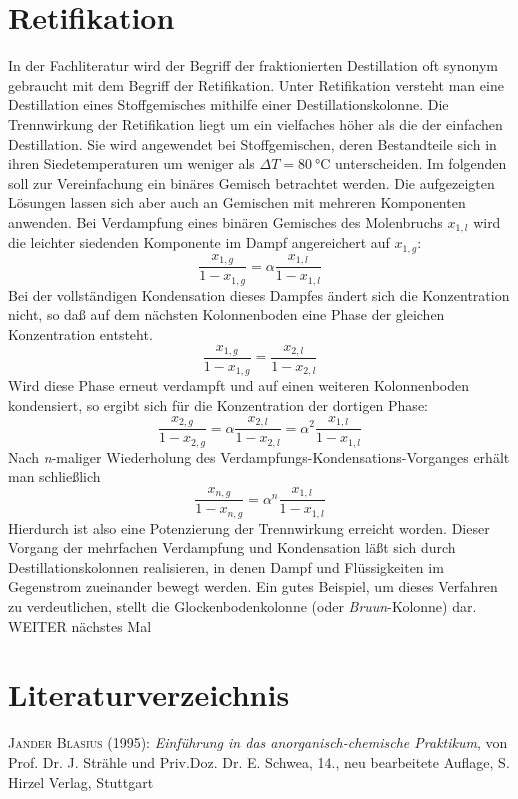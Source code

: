 \documentclass[11pt]{scrartcl}		%
\begin{document}
\section{Retifikation}
In der Fachliteratur wird der Begriff der fraktionierten Destillation oft synonym gebraucht mit dem Begriff der Retifikation. Unter Retifikation versteht man eine Destillation eines Stoffgemisches mithilfe einer Destillationskolonne. Die Trennwirkung der Retifikation liegt um ein vielfaches höher als die der einfachen Destillation. Sie wird angewendet bei Stoffgemischen, deren Bestandteile sich in ihren Siedetemperaturen um weniger als $\Delta T = \SI{80}{\celsius}$ unterscheiden.
%
Im folgenden soll zur Vereinfachung ein binäres Gemisch betrachtet werden. Die aufgezeigten Lösungen lassen sich aber auch an Gemischen mit mehreren Komponenten anwenden. Bei Verdampfung eines binären Gemisches des Molenbruchs $x_{1,l}$ wird die leichter siedenden Komponente im Dampf angereichert auf $x_{1,g}$:
\begin{equation}
	\frac{x_{1,g}}{1-x_{1,g}} = \alpha \frac{x_{1,l}}{1-x_{1,l}}
\end{equation}
Bei der vollständigen Kondensation dieses Dampfes ändert sich die Konzentration nicht, so daß auf dem nächsten Kolonnenboden eine Phase der gleichen Konzentration entsteht.
\begin{equation}
	\frac{x_{1,g}}{1-x_{1,g}} = \frac{x_{2,l}}{1-x_{2,l}}
\end{equation}
Wird diese Phase erneut verdampft und auf einen weiteren Kolonnenboden kondensiert, so ergibt sich für die Konzentration der dortigen Phase:
\begin{equation}
	\frac{x_{2,g}}{1-x_{2,g}} = \alpha \frac{x_{2,l}}{1-x_{2,l}} =  \alpha^2 \frac{x_{1,l}}{1-x_{1,l}}
\end{equation}
Nach \emph{n}-maliger Wiederholung des Verdampfungs-Kondensations-Vorganges erhält man schließlich
\begin{equation}
	\frac{x_{n,g}}{1-x_{n,g}} = \alpha^n \frac{x_{1,l}}{1-x_{1,l}}
\end{equation}
Hierdurch ist also eine Potenzierung der Trennwirkung erreicht worden.
Dieser Vorgang der mehrfachen Verdampfung und Kondensation läßt sich durch Destillationskolonnen realisieren, in denen Dampf und Flüssigkeiten im Gegenstrom zueinander bewegt werden. Ein gutes Beispiel, um dieses Verfahren zu verdeutlichen, stellt die Glockenbodenkolonne (oder \emph{Bruun}-Kolonne) dar.
\\
WEITER nächstes Mal
\\
%
\section{Literaturverzeichnis}
%
\textsc{Jander Blasius} (1995): \textit{Einführung in das anorganisch-chemische Praktikum}, von Prof. Dr. J. Strähle und Priv.Doz. Dr. E. Schwea, 14., neu bearbeitete Auflage, S. Hirzel Verlag, Stuttgart
%
\end{document}
